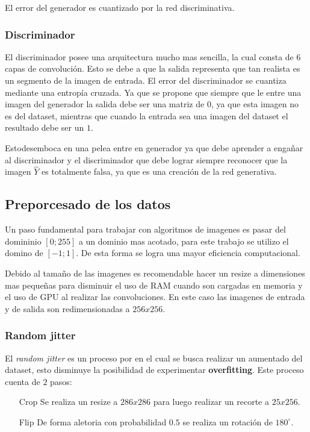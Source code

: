 \documentclass[]{IEEEtran}
\begin{document}
    El error del generador es cuantizado por la red discriminativa.

    \subsubsection{Discriminador}

    El discriminador posee una arquitectura mucho mas sencilla, la cual consta de $6$ capas de convolución.
    Esto se debe a que la salida representa que tan realista es un segmento de la imagen de entrada. 
    El error del discriminador se cuantiza mediante una entropía cruzada. Ya que 
    se propone que siempre que le entre una imagen del generador la salida debe ser una matriz de $0$, ya que 
    esta imagen no es del dataset, mientras que cuando la entrada sea una imagen del dataset el resultado debe ser un $1$. 
    
    Estodesemboca en una pelea entre en generador ya que debe aprender a engañar al discriminador 
    y el discriminador que debe lograr siempre reconocer que la imagen $\hat{Y}$ es totalmente falsa, ya que es una 
    creación de la red generativa.
 
    \subsection{Preporcesado de los datos}

    Un paso fundamental para trabajar con algoritmos de imagenes es pasar del domininio $[0;255]$ a 
    un dominio mas acotado, para este trabajo se utilizo el domino de $[-1;1]$. De esta forma se logra 
    una mayor eficiencia computacional.

    Debido al tamaño de las imagenes es recomendable hacer un resize a dimensiones mas pequeñas 
    para disminuir el uso de RAM cuando son cargadas en memoria y el uso de GPU al realizar las convoluciones. En 
    este caso las imagenes de entrada y de salida son redimensionadas a $256x256$.

    \subsubsection{Random jitter}

    El \textit{random jitter} es un proceso por en el cual se busca realizar un aumentado
    del dataset, esto disminuye la posibilidad de experimentar \textbf{overfitting}. 
    Este proceso cuenta de $2$ pasos:

    \begin{itemize}
        \item[Crop] Se realiza un resize a $286x286$ para luego realizar un recorte a $25x256$.
        \item[Flip] De forma aletoria con probabilidad $0.5$ se realiza un rotación de $180^\circ$. 
    \end{itemize}
\end{document}
